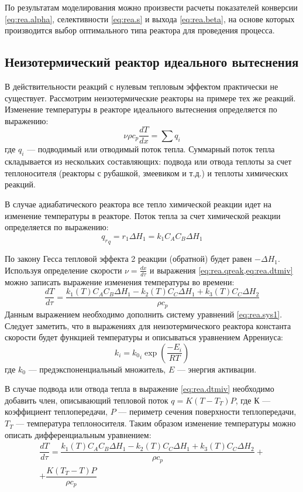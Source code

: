 По результатам моделирования можно произвести расчеты показателей конверсии \eqref{eq:rea.alpha}, селективности \eqref{eq:rea.s} и выхода \eqref{eq:rea.beta}, на основе которых производится выбор оптимального типа реактора для проведения процесса. 

\subsection*{Неизотермический реактор идеального вытеснения}
В действительности реакций с нулевым тепловым эффектом практически не существует. Рассмотрим неизотермические реакторы на примере тех же реакций.
Изменение температуры в реакторе идеального вытеснения определяется по выражению:
\begin{equation}\label{eq:rea.dtmiv}
	\nu \rho c_p \dfrac{d T}{d x} = \sum q_i
\end{equation}
где $q_i$ --- подводимый или отводимый поток тепла. Суммарный поток тепла складывается из нескольких составляющих: подвода или отвода теплоты за счет теплоносителя (реакторы с рубашкой, змеевиком и т.д.) и теплоты химических реакций. 

В случае адиабатического реактора все тепло химической реакции идет на изменение температуры в реакторе. Поток тепла за счет химической реакции определяется по выражению:
\begin{equation} \label{eq:rea.qreak}
	{q_r}_q=r_1 \Delta H_1 = k_1 C_A C_B \Delta H_1
\end{equation}

По закону Гесса тепловой эффекта 2 реакции (обратной) будет равен $-\Delta H_1$. Используя определение скорости $\nu=\frac{d x }{d \tau}$ и выражения \cref{eq:rea.qreak,eq:rea.dtmiv} можно записать выражение изменения температуры во времени:
\begin{equation}\label{eq:rea.dtmiv1}
	\dfrac{d T}{d \tau}= \dfrac {k_1(T) C_A C_B \Delta H_1 -k_2(T) C_C \Delta H_1 +k_3(T) C_C \Delta H_2}{\rho c_p} 
\end{equation}
Данным выражением необходимо дополнить систему уравнений \cref{eq:rea.sys1}. Следует заметить, что в выражениях для  неизотермического реактора константа скорости будет функцией температуры и описываться уравнением Аррениуса:
\begin{equation}
	k_i={k_0}_i \exp \left( \dfrac{-E_i}{RT}\right)
\end{equation}
где $k_0$ --- предэкспоненциальный множитель,  $E$ --- энергия активации.

В случае подвода или отвода тепла в выражение \eqref{eq:rea.dtmiv} необходимо добавить член, описывающий тепловой поток $q=K(T-T_T)P$, где $К$ --- коэффициент теплопередачи, $P$ --- периметр сечения поверхности теплопередачи, $T_T$ --- температура теплоносителя. Таким образом изменение температуры можно описать дифференциальным уравнением:
\begin{eqnarray}\label{eq:rea.dtmiv2}
\dfrac{d T}{d \tau}= \dfrac {k_1(T) C_A C_B \Delta H_1 -k_2(T) C_C \Delta H_1 +k_3(T) C_C \Delta H_2}{\rho c_p} + \nonumber \\ + \dfrac{K(T_T-T)P}{\rho c_p} \quad
\end{eqnarray}

